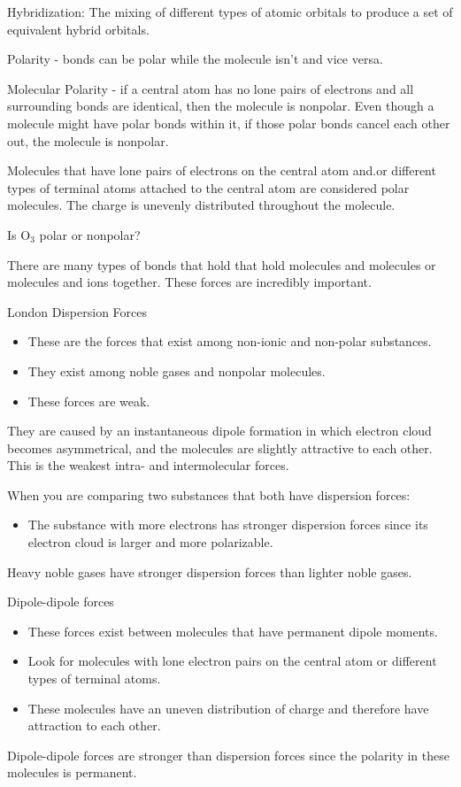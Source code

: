 \documentclass[../hchem.tex]{subfiles}
\begin{document}
Hybridization: The mixing of different types of atomic orbitals to produce a set of equivalent hybrid orbitals.

Polarity - bonds can be polar while the molecule isn't and vice versa.

Molecular Polarity - if a central atom has no lone pairs of electrons and all surrounding bonds are identical, then the molecule is nonpolar.
Even though a molecule might have polar bonds within it, if those polar bonds cancel each other out, the molecule is nonpolar.

Molecules that have lone pairs of electrons on the central atom and.or different types of terminal atoms attached to the central atom are considered polar molecules. The charge is unevenly distributed throughout the molecule.

\ex Is O$_3$ polar or nonpolar?

There are many types of bonds that hold that hold molecules and molecules or molecules and ions together. These forces are incredibly important.

London Dispersion Forces 
\begin{itemize}
    \item These are the forces that exist among non-ionic and non-polar substances. 
    \item They exist among noble gases and nonpolar molecules.
    \item These forces are weak.
\end{itemize}

They are caused by an instantaneous dipole formation in which electron cloud becomes asymmetrical, and the molecules are slightly attractive to each other.
This is the weakest intra- and intermolecular forces.

When you are comparing two substances that both have dispersion forces:
\begin{itemize}
    \item The substance with more electrons has stronger dispersion forces since its electron cloud is larger and more polarizable.
\end{itemize}
Heavy noble gases have stronger dispersion forces than lighter noble gases.

Dipole-dipole forces 
\begin{itemize}
    \item These forces exist between molecules that have permanent dipole moments.
    \item Look for molecules with lone electron pairs on the central atom or different types of terminal atoms.
    \item These molecules have an uneven distribution of charge and therefore have attraction to each other.
\end{itemize}
Dipole-dipole forces are stronger than dispersion forces since the polarity in these molecules is permanent.
\end{document}
